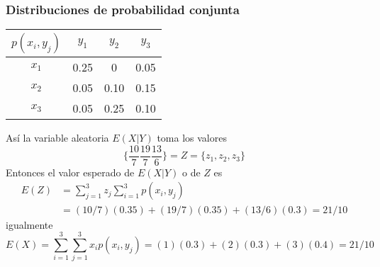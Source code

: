 \documentclass[spanish]{beamer}
\begin{document}
\begin{frame}
\frametitle{Distribuciones de probabilidad conjunta}

\begin{center}
\begin{tabular}{ c c c c } 
\hline
$p(x_{i},y_{j})$ & $y_{1}$ & $y_{2}$ & $y_{3}$\\
 \hline
 $x_{1}$ & 0.25 & 0  & 0.05\\ 
 $x_{2}$ & 0.05 & 0.10 & 0.15\\ 
 $x_{3}$ & 0.05 & 0.25 & 0.10\\ 
 \hline
\end{tabular}
\end{center}

Así la variable aleatoria $E(X\vert Y)$ toma los valores 
\begin{equation*}
\bigg\lbrace \frac{10}{7} \frac{19}{7} \frac{13}{6}\bigg\rbrace = Z = \lbrace z_{1},z_{2},z_{3}\rbrace
\end{equation*}
Entonces el valor esperado de $E(X\vert Y)$ o de $Z$ es 
\begin{equation*} 
\begin{split}
E(Z) &= \sum_{j=1}^3 z_{j} \sum_{i=1}^3  p(x_{i}, y_{j}) \\
& = (10/7)(0.35)+(19/7)(0.35)+(13/6)(0.3)=21/10
\end{split}
\end{equation*}
igualmente 
\begin{equation*}
E(X) = \sum_{i=1}^3 \sum_{j=1}^3 x_{i}p(x_{i},y_{j}) = (1)(0.3)+(2)(0.3)+(3)(0.4)=21/10
\end{equation*}

\end{frame}


\end{document}
